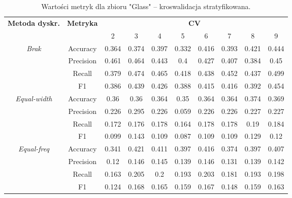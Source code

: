 \begin{table}[H]
\center
    \caption{Wartości metryk dla zbioru "Glass" -- kroswalidacja stratyfikowana.}
    \begin{tabular}{|c|c|c|c|c|c|c|c|c|c|}
        \hline
        \multirow{2}{*}{\textbf{Metoda dyskr.}} & \multirow{2}{*}{\textbf{Metryka}} & \multicolumn{8}{|c|}{\textbf{CV}} \\ \cline{3-10}
                        &  & 2 & 3 & 4 & 5 & 6 & 7 & 8 & 9 \\ \hline
        \multirow{4}{*}{\textit{Brak}}  & Accuracy & 0.364 & 0.374 & 0.397 & 0.332 & 0.416 & 0.393 & 0.421 & 0.444 \\ \cline{2-10}
                                         & Precision & 0.461 & 0.464 & 0.443 & 0.4 & 0.427 & 0.407 & 0.384 & 0.45 \\ \cline{2-10}
                                         & Recall & 0.379 & 0.474 & 0.465 & 0.418 & 0.438 & 0.452 & 0.437 & 0.499 \\ \cline{2-10}
                                         & F1 & 0.386 & 0.439 & 0.426 & 0.388 & 0.415 & 0.416 & 0.392 & 0.454 \\ \hline \hline


        \multirow{4}{*}{\textit{Equal-width}}  & Accuracy & 0.36 & 0.36 & 0.364 & 0.35 & 0.364 & 0.364 & 0.374 & 0.369 \\ \cline{2-10}
                                             & Precision & 0.226 & 0.295 & 0.226 & 0.059 & 0.226 & 0.226 & 0.227 & 0.227 \\ \cline{2-10}
                                             & Recall & 0.172 & 0.176 & 0.178 & 0.164 & 0.178 & 0.178 & 0.19 & 0.184 \\ \cline{2-10}
                                             & F1 & 0.099 & 0.143 & 0.109 & 0.087 & 0.109 & 0.109 & 0.129 & 0.12 \\ \hline \hline


        \multirow{4}{*}{\textit{Equal-freq}}  & Accuracy & 0.341 & 0.421 & 0.411 & 0.397 & 0.416 & 0.374 & 0.397 & 0.407 \\ \cline{2-10}
                                             & Precision & 0.12 & 0.146 & 0.145 & 0.139 & 0.146 & 0.131 & 0.139 & 0.142 \\ \cline{2-10}
                                             & Recall & 0.163 & 0.205 & 0.2 & 0.193 & 0.203 & 0.181 & 0.193 & 0.198 \\ \cline{2-10}
                                             & F1 & 0.124 & 0.168 & 0.165 & 0.159 & 0.167 & 0.148 & 0.159 & 0.163 \\ \hline \hline



\end{tabular}
\end{table}
